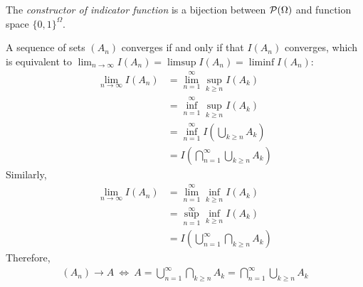 \documentclass{article}
\begin{document}
   	\begin{remark}
   		The \emph{constructor of indicator function} is a bijection between $\mathcal{{P}}(\Omega)$ and function space $\{0, 1\}^\Omega$.
   	\end{remark}
   	
   	\begin{proposition}
   		A sequence of sets $(A_n)$ converges if and only if that $I(A_n)$ converges, which is equivalent to $\lim_{n \to \infty} I(A_n) = \limsup I(A_n) = \liminf I(A_n)$:
   		\begin{align}
   			\lim_{n \to \infty} I(A_n) &= \lim_{n=1}^\infty \sup_{k\geq n} I(A_k) \\
   			&=\inf_{n=1}^\infty \sup_{k\geq n} I(A_k) \\
   			&=\inf_{n=1}^\infty I(\bigcup_{k \geq n} A_k) \\
   			&=I(\bigcap_{n=1}^\infty \bigcup_{k \geq n} A_k)
   		\end{align}
   		Similarly,
   		\begin{align}
   			\lim_{n \to \infty} I(A_n) &= \lim_{n=1}^\infty \inf_{k\geq n} I(A_k) \\
   			&= \sup_{n=1}^\infty \inf_{k\geq n} I(A_k) \\
   			&= I(\bigcup_{n=1}^\infty \bigcap_{k \geq n} A_k)
   		\end{align}
   		Therefore, 
   		\begin{align}
   			(A_n) \to A\ \iff\ A = \bigcup_{n=1}^\infty \bigcap_{k \geq n} A_k = \bigcap_{n=1}^\infty \bigcup_{k \geq n} A_k
   		\end{align}
   	\end{proposition}
   	
   	\begin{proposition}
   		
   	\end{proposition}
\end{document}
